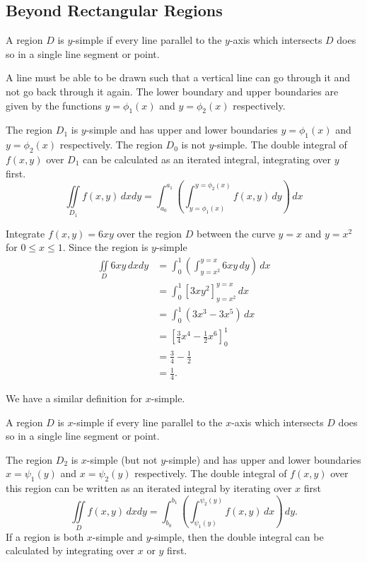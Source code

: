 \documentclass[10pt, a4paper]{article}
\begin{document}
\subsection{Beyond Rectangular Regions}
\begin{definition}
    A region $D$ is $y$-simple if every line parallel to the $y$-axis which intersects $D$ does so in a single line segment or point.
\end{definition}
A line must be able to be drawn such that a vertical line can go through it and not go back through it again.
The lower boundary and upper boundaries are given by the functions $y = \phi_1(x)$ and $y = \phi_2(x)$ respectively.

The region $D_1$ is $y$-simple and has upper and lower boundaries $y = \phi_1(x)$ and $y = \phi_2(x)$ respectively.
The region $D_0$ is not $y$-simple.
The double integral of $f(x, y)$ over $D_1$ can be calculated as an iterated integral,
integrating over $y$ first.
\[
\iint\limits_{D_1}f(x, y)\,dxdy = \int_{a_0}^{a_1}\left(\int_{y = \phi_1(x)}^{y = \phi_2(x)}f(x, y)\,dy\right)\,dx
\]
\begin{example}
    Integrate $f(x, y) = 6xy$ over the region $D$ between the curve $y = x$ and $y = x ^ 2$ for $0 \leq x \leq 1$.
    Since the region is $y$-simple
    \begin{align*}
        \iint\limits_{D}6xy\,dxdy &= \int_0^1\left(\int_{y = x ^ 2}^{y = x}6xy\,dy\right)\,dx \\
        &=\int_0^1\left[3xy^2\right]_{y = x ^ 2}^{y = x}\,dx \\
        &= \int_0^1\left(3x ^ 3 - 3x ^ 5\right)\,dx \\
        &= \left[\frac{3}{4}x ^ 4 - \frac{1}{2}x ^ 6\right]_0^1 \\
        &= \frac{3}{4} - \frac{1}{2} \\
        &= \frac{1}{4}.
    \end{align*}
\end{example}

We have a similar definition for $x$-simple.
\begin{definition}
    A region $D$ is $x$-simple if every line parallel to the $x$-axis which intersects $D$ does so in a single line segment or point.
\end{definition}

The region $D_2$ is $x$-simple
(but not $y$-simple)
and has upper and lower boundaries $x = \psi_1(y)$ and $x = \psi_2(y)$ respectively.
The double integral of $f(x, y)$ over this region can be written as an iterated integral by iterating over $x$ first
\[
\iint\limits_Df(x, y)\,dxdy = \int_{b_0}^{b_1}\left(\int_{\psi_1(y)}^{\psi_2(y)}f(x, y)\,dx\right)\,dy.
\]
If a region is both $x$-simple and $y$-simple,
then the double integral can be calculated by integrating over $x$ or $y$ first.
\end{document}
